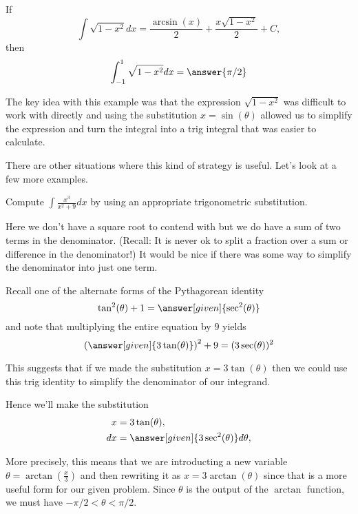 \documentclass{ximera}
\begin{document}
\begin{question}
  If
  \[
  \int \sqrt{1-x^2} dx = \frac{\arcsin(x)}{2} + \frac{x\sqrt{1-x^2}}{2} + C,
  \]
  then
  \[
  \int_{-1}^{1}\sqrt{1-x^2} dx = \answer{\pi/2}
  \]
\end{question}



The key idea with this example was that the expression $\sqrt{1-x^{2}}$ was difficult to work with directly and 
using the substitution $x=\sin(\theta)$ allowed us to simplify the expression and turn the integral 
into a trig integral that was easier to calculate. 


There are other situations where this kind of strategy is useful. Let's look at a few more examples.

\begin{example}
  Compute $\int \frac{x^3}{x^2+9} dx$ by using an appropriate trigonometric substitution.
  
  \begin{explanation}
Here we don't have a square root to contend with but we do have a sum of two 
terms in the denominator. (Recall: It is never ok to split a fraction over a sum or difference in the denominator!)   It would be nice if there was some way to simplify the denominator into just one term. 

   Recall one of the alternate forms of the Pythagorean identity
    \[
    \tan^2(\theta) + 1 = \answer[given]{\sec^2(\theta)}
    \]
    and note that multiplying the entire equation by $9$ yields
    \[
    \left(\answer[given]{3\tan(\theta)}\right)^2 + 9 = (3\sec(\theta))^2
    \]

This suggests that if we made the substitution $x=3\tan(\theta)$ then we could
use this trig identity to simplify the denominator of our integrand. 

    Hence we'll make the substitution
    \begin{align*}
      x &= 3\tan(\theta),\\
      dx &= \answer[given]{3\sec^2(\theta)} d\theta,
    \end{align*}

\begin{remark}
More precisely, this means that we are introducting a new variable $\theta=\arctan\left(\frac{x}{3}\right)$ 
and then rewriting it as $x=3\arctan(\theta)$ since that is a more useful form 
for our given problem. Since $\theta$ is the output of the $\arctan$ function, we must have
$-\pi/2 < \theta < \pi/2$. 
\end{remark}


\end{explanation}
\end{example}
\end{document}
